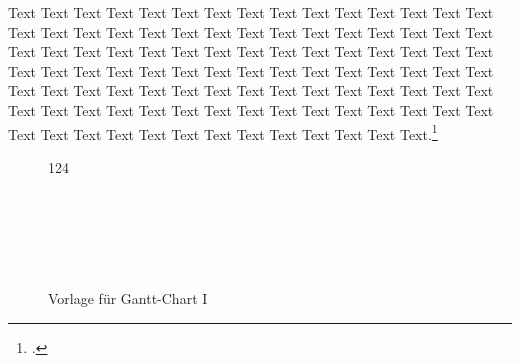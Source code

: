\documentclass[final, english, ngerman, a4paper, 12pt, %
numbers=noenddot,
cd=true,
cdfont=false,cdfont=nohead,cdfont=nodin,
cdmath=false,
cdhead=false,
cdfoot=true,
cdcover=monochrome,
cdgeometry=symmetric,
declaration=heading,
declaration=notoc,
abstract=heading,
]{tudscrreprt}
\begin{document}
Text Text Text Text Text Text Text Text Text Text Text Text Text Text Text Text Text Text Text Text Text Text Text Text Text Text Text Text Text Text Text Text Text Text Text Text Text Text Text Text Text Text Text Text Text Text Text Text Text Text Text Text Text Text Text Text Text Text Text Text Text Text Text Text Text Text Text Text Text Text Text Text Text Text Text Text Text Text Text Text Text Text Text Text Text Text Text Text Text Text Text Text Text Text Text Text Text Text Text Text Text Text Text.\footcite[Vgl.][35]{HinzH1:2009}


	\begin{figure}[h]
	\begin{ganttchart}[vgrid, bar height=0.8, x unit = 0.6 cm, bar top shift=.1, title height=0.8, y unit title= 0.7 cm, y unit chart = 0.7 cm,]  %
		{1}{24}  %
		 \\    %
		\\   %
		\\   %
		 \ganttnewline[black]   %
		\\	
		\ganttnewline[black]
		\\		
		\\			
	\end{ganttchart}
	\caption{Vorlage für Gantt-Chart I}\label{gantt1}
\end{figure}
\end{document}

